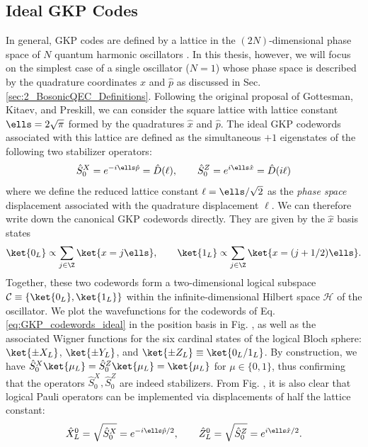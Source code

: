 \subsection{Ideal GKP Codes}
In general, GKP codes are defined by a lattice in the $(2N)$-dimensional phase space of $N$ quantum harmonic oscillators \cite{gottesman2001gkp, royer2022multimodegkp}. In this thesis, however, we will focus on the simplest case of a single oscillator ($N=1$) whose phase space is described by the quadrature coordinates $\hat{x}$ and $\hat{p}$ as discussed in Sec. \ref{sec:2_BosonicQEC_Definitions}. Following the original proposal of Gottesman, Kitaev, and Preskill, we can consider the square lattice with lattice constant $\ells = 2\sqrt{\pi}$ formed by the quadratures $\hat{x}$ and $\hat{p}$. The ideal GKP codewords associated with this lattice are defined as the simultaneous $+1$ eigenstates of the following two stabilizer operators: 
\begin{equation}
    \hat{S}_0^X = e^{-i\ells\hat{p}} = \hat{D}(\ell) , \qquad \hat{S}_0^Z = e^{i\ells\hat{x}} = \hat{D}(i\ell)
\end{equation}
where we define the reduced lattice constant $\ell = \ells/\sqrt{2}$ as the \textit{phase space} displacement associated with the quadrature displacement $\ell$. We can therefore write down the canonical GKP codewords directly. They are given by the $\hat{x}$ basis states
\begin{equation}
    \ket{0_L} \propto \sum_{j \in \Z} \ket{x = j\ells}, \qquad \ket{1_L} \propto \sum_{j \in \Z} \ket{x = (j + 1/2)\ells}.
    \label{eq:GKP_codewords_ideal}
\end{equation}
Together, these two codewords form a two-dimensional logical subspace $\mathcal{C} \equiv \{\ket{0_L}, \ket{1_L}\}$ within the infinite-dimensional Hilbert space $\mathcal{H}$ of the oscillator. We plot the wavefunctions for the codewords of Eq. \eqref{eq:GKP_codewords_ideal} in the position basis in Fig. , as well as the associated Wigner functions for the six cardinal states of the logical Bloch sphere: $\ket{\pm X_L}$, $\ket{\pm Y_L}$, and $\ket{\pm Z_L} \equiv \ket{0_L/1_L}$. By construction, we have $\hat{S}_0^X\ket{\mu_L} = \hat{S}_0^Z\ket{\mu_L} = \ket{\mu_L}$ for $\mu\in\{0, 1\}$, thus confirming that the operators $\hat{S}_0^X, \hat{S}_0^Z$ are indeed stabilizers. From Fig. , it is also clear that logical Pauli operators can be implemented via displacements of half the lattice constant: 
\begin{equation}
    \hat{X}_L^0 = \sqrt{\hat{S}_0^X} =  e^{-i\ells\hat{p}/2} , \qquad \hat{Z}_L^0 = \sqrt{\hat{S}_0^Z} = e^{i\ells\hat{x}/2}. 
\end{equation}

